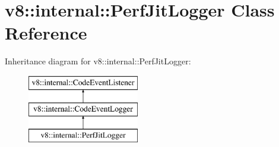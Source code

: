 \hypertarget{classv8_1_1internal_1_1_perf_jit_logger}{}\section{v8\+:\+:internal\+:\+:Perf\+Jit\+Logger Class Reference}
\label{classv8_1_1internal_1_1_perf_jit_logger}
Inheritance diagram for v8\+:\+:internal\+:\+:Perf\+Jit\+Logger\+:\begin{figure}[H]
\begin{center}
\leavevmode
\includegraphics[height=3.000000cm]{classv8_1_1internal_1_1_perf_jit_logger}
\end{center}
\end{figure}
